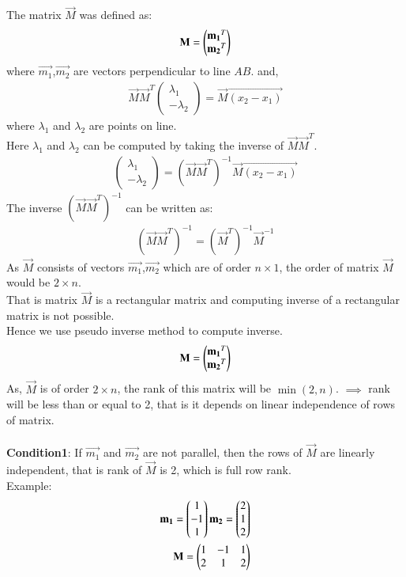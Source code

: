 \documentclass[journal,12pt,twocolumn]{IEEEtran}
\begin{document}
The matrix $\vec{M}$ was defined as:
\begin{align}
    \mathbf{M}=\begin{pmatrix}\mathbf{m_1}^T\\\mathbf{m_2}^T\end{pmatrix}
\end{align}
where $\vec{m_1}$,$\vec{m_2}$ are vectors perpendicular to line ${AB}$.
and,
\begin{align}
    \vec{M}\vec{M}^T\begin{pmatrix}\lambda_1\\-\lambda_2\end{pmatrix}=\vec{M}\vec{(x_2-x_1)}
\end{align}
where $\lambda_1$ and $\lambda_2$ are points on line.\\
Here $\lambda_1$ and $\lambda_2$ can be computed by taking the inverse of $\vec{M}\vec{M}^T$.\\
\begin{align}
    \begin{pmatrix}\lambda_1\\-\lambda_2\end{pmatrix}=(\vec{M}\vec{M}^T)^{-1}\vec{M}\vec{(x_2-x_1)}
\end{align}
The inverse $(\vec{M}\vec{M}^T)^{-1}$ can be written as:
\begin{align}
    (\vec{M}\vec{M}^T)^{-1} = (\vec{M}^T)^{-1}\vec{M}^{-1} \label{eq:eq_1}
\end{align}
As $\vec{M}$ consists of vectors $\vec{m_1}$,$\vec{m_2}$ which are of order $n\times1$, the order of matrix $\vec{M}$ would be $2 \times n$.\\ That is matrix $\vec{M}$ is a rectangular matrix and computing inverse of a rectangular matrix is not possible.\\ Hence we use pseudo inverse method to compute inverse.
\begin{align}
    \mathbf{M}=\begin{pmatrix}\mathbf{m_1}^T\\\mathbf{m_2}^T\end{pmatrix}
\end{align}
As, $\vec{M}$ is of order $2 \times n$, the rank of this matrix will be $\min(2, n)$. $\implies$ rank will be less than or equal to 2, that is it depends on linear independence of rows of matrix.\\
\\
\textbf{Condition1}: If $\vec{m_1}$ and $\vec{m_2}$ are not parallel, then the rows of $\vec{M}$ are linearly independent, that is rank of $\vec{M}$ is 2, which is full row rank.\\
Example:
\begin{align}
    \mathbf{m_1} = \begin{pmatrix}1\\-1\\1\end{pmatrix}
    \mathbf{m_2} = \begin{pmatrix}2\\1\\2\end{pmatrix}\\
    \mathbf{M} = \begin{pmatrix}1&-1&1\\2&1&2\end{pmatrix}
\end{align}
\end{document}
